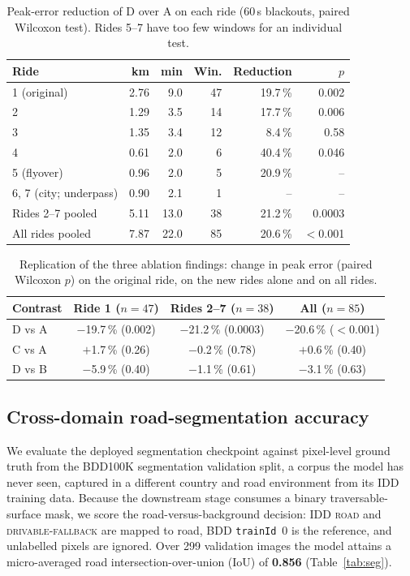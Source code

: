 \documentclass[conference]{IEEEtran}
\begin{document}
\begin{table}[t]
\centering
\caption{Peak-error reduction of D over A on each ride (60\,s blackouts, paired Wilcoxon test). Rides 5--7 have too few windows for an individual test.}
\label{tab:rides}
\setlength{\tabcolsep}{3pt}
\begin{tabular}{@{}lrrrrr@{}}
\toprule
\textbf{Ride} & \textbf{km} & \textbf{min} & \textbf{Win.} & \textbf{Reduction} & \textbf{$p$}\\
\midrule
1 (original) & 2.76 & 9.0 & 47 & 19.7\,\% & 0.002\\
2 & 1.29 & 3.5 & 14 & 17.7\,\% & 0.006\\
3 & 1.35 & 3.4 & 12 & 8.4\,\% & 0.58\\
4 & 0.61 & 2.0 & 6 & 40.4\,\% & 0.046\\
5 (flyover) & 0.96 & 2.0 & 5 & 20.9\,\% & --\\
6, 7 (city; underpass) & 0.90 & 2.1 & 1 & -- & --\\
\midrule
Rides 2--7 pooled & 5.11 & 13.0 & 38 & 21.2\,\% & 0.0003\\
All rides pooled & 7.87 & 22.0 & 85 & 20.6\,\% & $<$0.001\\
\bottomrule
\end{tabular}
\end{table}

\begin{table}[t]
\centering
\caption{Replication of the three ablation findings: change in peak error (paired Wilcoxon $p$) on the original ride, on the new rides alone and on all rides.}
\label{tab:repl}
\setlength{\tabcolsep}{3pt}
\begin{tabular}{@{}lccc@{}}
\toprule
\textbf{Contrast} & \textbf{Ride 1} ($n{=}47$) & \textbf{Rides 2--7} ($n{=}38$) & \textbf{All} ($n{=}85$)\\
\midrule
D vs A & $-$19.7\,\% (0.002) & $-$21.2\,\% (0.0003) & $-$20.6\,\% ($<$0.001)\\
C vs A & $+$1.7\,\% (0.26) & $-$0.2\,\% (0.78) & $+$0.6\,\% (0.40)\\
D vs B & $-$5.9\,\% (0.40) & $-$1.1\,\% (0.61) & $-$3.1\,\% (0.63)\\
\bottomrule
\end{tabular}
\end{table}

\subsection{Cross-domain road-segmentation accuracy}
\label{sec:seg}
We evaluate the deployed segmentation checkpoint against pixel-level ground truth from the BDD100K segmentation validation split, a corpus the model has never seen, captured in a different country and road environment from its IDD training data. Because the downstream stage consumes a binary traversable-surface mask, we score the road-versus-background decision: IDD \textsc{road} and \textsc{drivable-fallback} are mapped to road, BDD \texttt{trainId}~0 is the reference, and unlabelled pixels are ignored. Over 299 validation images the model attains a micro-averaged road intersection-over-union (IoU) of \textbf{0.856} (Table~\ref{tab:seg}).
\end{document}
